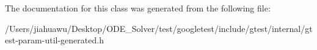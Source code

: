 The documentation for this class was generated from the following file\+:\begin{DoxyCompactItemize}
\item 
/\+Users/jiahuawu/\+Desktop/\+O\+D\+E\+\_\+\+Solver/test/googletest/include/gtest/internal/gtest-\/param-\/util-\/generated.\+h\end{DoxyCompactItemize}
